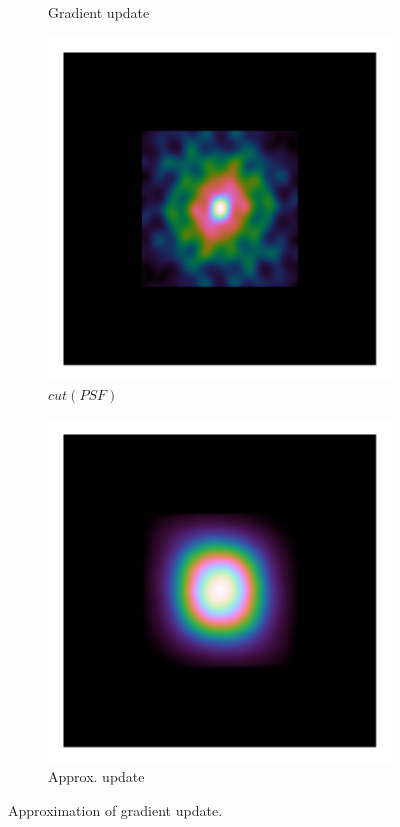 \begin{figure}[h]
\begin{subfigure}[b]{0.245\linewidth}
		\caption{Gradient update}
	\end{subfigure}
	\begin{subfigure}[b]{0.245\linewidth}
		\includegraphics[width=\linewidth, clip, trim= 0.25in 0.25in 0.25in 0.25in]{./chapters/03.cd/simulated/psfCut.png}
		\caption{$cut(PSF)$}
	\end{subfigure}
	\begin{subfigure}[b]{0.245\linewidth}
		\includegraphics[width=\linewidth, clip, trim= 0.25in 0.25in 0.25in 0.25in]{./chapters/03.cd/simulated/psfSquaredCut.png}
		\caption{Approx. update}
	\end{subfigure}
	
	\caption{Approximation of gradient update.}
\end{figure} 

